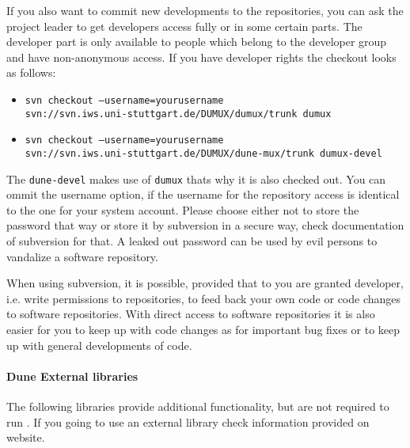 If you also want to commit new developments to the repositories, you can ask the \Dumux project leader to get developers access fully or in some certain parts. The developer part is only available to people which belong to the \Dumux developer group and have non-anonymous access. If you have developer rights the checkout looks as follows: 
\begin{itemize}
 \item \texttt{svn checkout --username=yourusername \\ 
      \hspace{4cm} svn://svn.iws.uni-stuttgart.de/DUMUX/dumux/trunk dumux}
 \item \texttt{svn checkout --username=yourusername \\
      \hspace{4cm} svn://svn.iws.uni-stuttgart.de/DUMUX/dune-mux/trunk dumux-devel}
\end{itemize} 
The \texttt{dune-devel} makes use of \texttt{dumux} thats why it is also checked out. You can ommit the username option, if the username for the repository access is identical to the one for your system account. Please choose either not to store the password that way or store it by subversion in a secure way, check documentation of subversion for that. A leaked out password can be used by evil persons to vandalize a software repository.

When using subversion, it is possible, provided that to you are granted developer, i.e. write permissions to repositories, to feed back
your own code or code changes to software repositories. With direct access to software repositories it is also easier for you to keep up with code changes as for important bug fixes or to keep up with general developments of code.


\paragraph{Dune External libraries}

The following libraries provide additional functionality, but are not required to run \Dumux.
If you going to use an external library check information provided on \Dune website.

